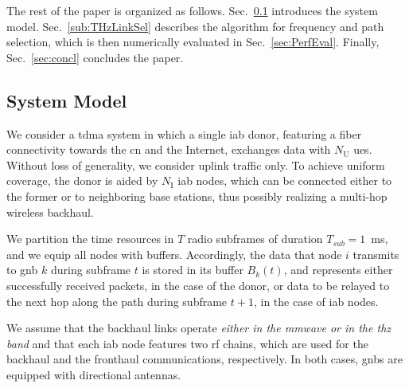 The rest of the paper is organized as follows. Sec.~\ref{sec:system} introduces the system model. Sec.~\ref{sub:THzLinkSel} describes the algorithm for frequency and path selection, which is then numerically evaluated in Sec.~\ref{sec:PerfEval}. Finally, Sec.~\ref{sec:concl} concludes the paper. 


\subsection{System Model}
\label{sec:system}

\begin{comment} %
We consider an \gls{iab} \gls{tdma} system in which a single \gls{iab} donor, featuring a fiber connectivity towards the \gls{cn} and the Internet, provides wireless backahuling functionality to $N_{\mathrm{I}}$ \gls{iab} nodes. On the access side, $N_{\mathrm{U}}$ \glspl{ue} %
exchange data with the \gls{iab} donor. %
The IAB nodes can be either connected to the latter, or to neighboring base stations thus possibly realizing a multi-hop wireless backhaul. 
\end{comment}

We consider a \gls{tdma} system in which a single \gls{iab} donor, featuring a fiber connectivity towards the \gls{cn} and the Internet, exchanges data with $N_{\mathrm{U}}$ \glspl{ue}. Without loss of generality, we consider uplink traffic only.
To achieve uniform coverage, the donor is aided by $N_{\mathrm{I}}$ \gls{iab} nodes, which can be connected either to the former or to neighboring base stations, thus possibly realizing a multi-hop wireless backhaul. 

We partition the time resources in $T$ radio subframes of duration $T_{sub} = 1$~ms, and we equip all nodes with buffers. Accordingly, the data that node $i$ transmits to \gls{gnb} $k$ during subframe $t$ is stored in its buffer $B_k (t)$, and represents either successfully received packets, in the case of the donor, or data to be relayed to the next hop along the path during subframe $t + 1$, in the case of \gls{iab} nodes.

We assume that the backhaul links operate \textit{either in the \gls{mmwave} or in the \gls{thz} band} and that each \gls{iab} node features two \gls{rf} chains, which are used for the backhaul and the fronthaul communications, respectively. In both cases, \glspl{gnb} are equipped with directional antennas.

